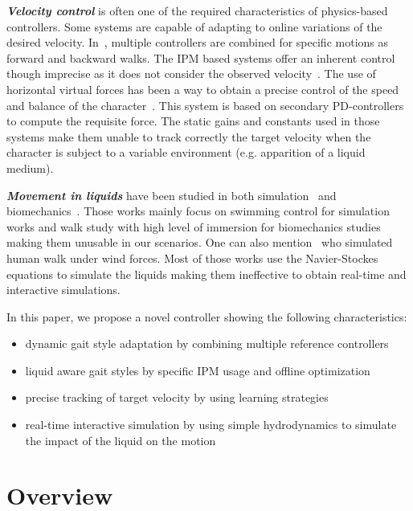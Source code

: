 \documentclass[conference]{acmsiggraph}
\begin{document}
\textbf{\textit{Velocity control}} is often one of the required characteristics of physics-based controllers. Some systems are capable of adapting to online variations of the desired velocity. In~\cite{coros2009robust}, multiple controllers are combined for specific motions as forward and backward walks. The IPM based systems offer an inherent control though imprecise as it does not consider the observed velocity~\cite{coros2010generalized}. The use of horizontal virtual forces has been a way to obtain a precise control of the speed and balance of the character~\cite{coros2010generalized,geijtenbeek2012simple}. This system is based on secondary PD-controllers to compute the requisite force. The static gains and constants used in those systems make them unable to track correctly the target velocity when the character is subject to a variable environment (e.g. apparition of a liquid medium). 

\textbf{\textit{Movement in liquids}} have been studied in both simulation~\cite{yang2004layered,si2014realistic} and biomechanics~\cite{barela2006biomechanical,chevutschi2009comparison}. Those works mainly focus on swimming control for simulation works and walk study with high level of immersion for biomechanics studies making them unusable in our scenarios.
One can also mention~\cite{lentine2011creature} who simulated human walk under wind forces. Most of those works use the Navier-Stockes equations to simulate the liquids making them ineffective to obtain real-time and interactive simulations.

In this paper, we propose a novel controller showing the following characteristics:
\begin{itemize}
\item{dynamic gait style adaptation by combining multiple reference controllers}
\item{liquid aware gait styles by specific IPM usage and offline optimization}
\item{precise tracking of target velocity by using learning strategies}
\item{real-time interactive simulation by using simple hydrodynamics to simulate the impact of the liquid on the motion}
\end{itemize}

\section{Overview}
\label{sec:overview}
\end{document}
